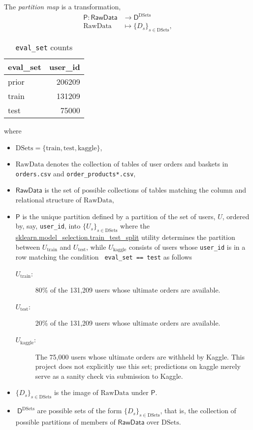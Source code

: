 \documentclass[11pt]{article}
\theoremstyle{definition}
\numberwithin{equation}{section}
\begin{document}
The \emph{partition map} is a transformation,
\begin{equation}\label{eq:partition-map}
\begin{split}
   \mathsf{P} :  \mathsf{RawData} &\rightarrow \mathsf{D}^{\textrm{DSets}} \\
     \mathrm{RawData} &\mapsto \{D_s\}_{s \in \textrm{DSets}},
\end{split}
\end{equation}%
\begin{wraptable}[7]{r}{0pt}
\begin{tabular}{lr}
    \toprule
    eval\_set &  user\_id \\
    \midrule
    prior    &   206209 \\
    train    &   131209 \\
    test     &    75000 \\
    \bottomrule
\end{tabular}
\centering
\caption*{\texttt{eval\_set} counts}
\end{wraptable}%
where
\begin{itemize}
\item \(\mathrm{DSets} = \{\mathrm{train, test, kaggle}\}\),
\item \(\mathrm{RawData}\) denotes the collection of tables of user orders and
baskets in \texttt{orders.csv} and \texttt{order\_products*.csv}, 
\item \(\mathsf{RawData}\) is the set of possible collections of tables matching the column
and relational structure of \(\mathrm{RawData}\),
\item \( \mathsf{P} \) is the unique partition defined by a partition of the set of users,
$U$, ordered by, say, \texttt{user\_id}, into $\{ U_s \}_{s \in \mathrm{DSets}}$ where the
\href{https://scikit-learn.org/stable/modules/generated/sklearn.model_selection.train_test_split.html}{sklearn.model\_selection.train\_test\_split}
utility determines the partition between \(U_\text{train}\) and
\(U_\text{test}\), while \(U_\text{kaggle}\) consists of users whose \texttt{user\_id} is
in a row matching the condition
\texttt{ eval\_set == \textquotesingle{}test\textquotesingle{}} as follows
\begin{description}
\item[\(U_\text{train}\):] 80\%
of the 131,209 users whose ultimate orders are available.
\item[\(U_\text{test}\):] 20\% of the 131,209 users whose ultimate orders are
available. 
\item [\(U_\text{kaggle}\):] The 75,000 users whose ultimate orders
are withheld by Kaggle. This project does not explicitly use this set;
predictions on kaggle merely serve as a sanity check via submission to
Kaggle.
\end{description}
\item \(\{D_s\}_{s \in \mathrm{DSets}}\) is the image of $\mathrm{RawData}$ under $\mathsf{P}$.
\item \(\ \mathsf{D}^{\mathrm{DSets}} \) are possible sets of the form \(\{D_s\}_{s \in \mathrm{DSets}}\),
that is, the collection of possible partitions of members of \(\mathsf{RawData}\) over \( \mathrm{DSets} \).
\end{itemize}
\end{document}
